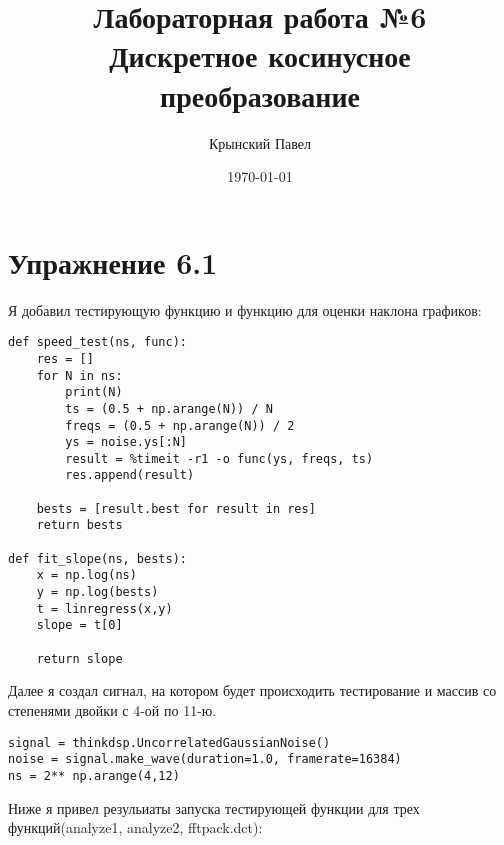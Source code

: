 \documentclass[a4paper,12pt]{report}
\title{Лабораторная работа №6\\Дискретное косинусное преобразование}
\author{Крынский Павел}
\date{\today}
\begin{document}
\maketitle
\tableofcontents
\listoffigures
\lstlistoflistings

\maketitle

\chapter{Упражнение 6.1}

Я добавил тестирующую функцию и функцию для оценки наклона графиков:

\begin{lstlisting}[caption=Тестирующая функция и функция для оценки наклона графиков]
def speed_test(ns, func):
    res = []
    for N in ns:
        print(N)
        ts = (0.5 + np.arange(N)) / N
        freqs = (0.5 + np.arange(N)) / 2
        ys = noise.ys[:N]
        result = %timeit -r1 -o func(ys, freqs, ts)
        res.append(result)
        
    bests = [result.best for result in res]
    return bests

def fit_slope(ns, bests): 
    x = np.log(ns)
    y = np.log(bests)
    t = linregress(x,y)
    slope = t[0]

    return slope
\end{lstlisting}

    Далее я создал сигнал, на котором будет происходить тестирование и массив со степенями двойки с 4-ой по 11-ю.
    

\begin{lstlisting}[caption=Массив степеней двойки]
signal = thinkdsp.UncorrelatedGaussianNoise()
noise = signal.make_wave(duration=1.0, framerate=16384)
ns = 2** np.arange(4,12)
\end{lstlisting}

Ниже я привел резульиаты запуска тестирующей функции для трех функций(analyze1, analyze2, fftpack.dct):   
\end{document}

